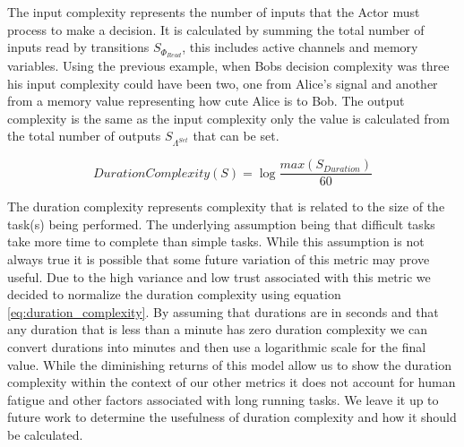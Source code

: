 The input complexity represents the number of inputs that the Actor must process to make a decision.  It is calculated by summing the total number of inputs read by transitions $S_{\Phi_{Read}}$, this includes active channels and memory variables.  Using the previous example, when Bobs decision complexity was three his input complexity could have been two, one from Alice's signal and another from a memory value representing how cute Alice is to Bob.  The output complexity is the same as the input complexity only the value is calculated from the total number of outputs $S_{\Lambda^{Set}}$ that can be set.

\begin{equation}
  DurationComplexity(S) = \log \frac{max(S_{Duration})}{60}
  \label{eq:duration_complexity}
\end{equation}

The duration complexity represents complexity that is related to the size of the task(s) being performed.  The underlying assumption being that difficult tasks take more time to complete than simple tasks.  While this assumption is not always true it is possible that some future variation of this metric may prove useful.  Due to the high variance and low trust associated with this metric we decided to normalize the duration complexity using equation \ref{eq:duration_complexity}.  By assuming that durations are in seconds and that any duration that is less than a minute has zero duration complexity we can convert durations into minutes and then use a logarithmic scale for the final value.  While the diminishing returns of this model allow us to show the duration complexity within the context of our other metrics it does not account for human fatigue and other factors associated with long running tasks.  We leave it up to future work to determine the usefulness of duration complexity and how it should be calculated.



